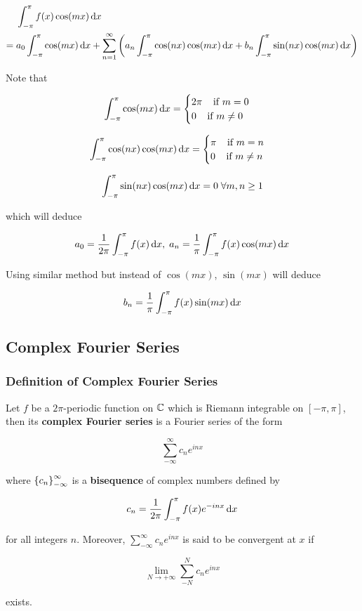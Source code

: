 \documentclass[a4paper,12pt]{article}
\begin{document}
$$\begin{aligned}[t]
  &\int_{-\pi}^{\pi}f(x)\cos(mx)\,\mathrm{d} x\\
  =\;&a_{0}\int_{-\pi}^{\pi}\cos(mx)\,\mathrm{d} x+\sum_{n=1}^{\infty}\left( a_{n}\int_{-\pi}^{\pi}\cos(nx)\cos(mx)\,\mathrm{d} x+b_{n}\int_{-\pi}^{\pi}\sin(nx)\cos(mx)\,\mathrm{d} x\right)
\end{aligned}$$\s

Note that

$$\int_{-\pi}^{\pi}\cos(mx)\,\mathrm{d} x=\begin{cases}
  2\pi\;\;\;\;\text{if }m=0\\
  0\;\;\;\;\text{if }m\neq 0
\end{cases}$$\s

$$\int_{-\pi}^{\pi}\cos(nx)\cos(mx)\,\mathrm{d} x=\begin{cases}
  \pi\;\;\;\;\text{if }m=n\\
  0\;\;\;\;\text{if }m\neq n
\end{cases}$$\s

$$\int_{-\pi}^{\pi}\sin(nx)\cos(mx)\,\mathrm{d} x=0\;\forall m,n\geq 1$$\s

which will deduce

$$a_{0}=\frac{1}{2\pi}\int_{-\pi}^{\pi}f(x)\,\mathrm{d} x,\;a_{n}=\frac{1}{\pi}\int_{-\pi}^{\pi}f(x)\cos(mx)\,\mathrm{d} x$$\s

Using similar method but instead of $\cos(mx)$, $\sin(mx)$ will deduce

$$b_{n}=\frac{1}{\pi}\int_{-\pi}^{\pi}f(x)\sin(mx)\,\mathrm{d} x$$

\subsection{Complex Fourier Series}
\subsubsection{Definition of Complex Fourier Series}
\begin{dft}
  Let $f$ be a $2\pi$-periodic function on $\mathbb{C}$ which is Riemann integrable on $[-\pi,\pi]$, then its \textbf{complex Fourier series} is a Fourier series of the form

  $$\sum_{-\infty}^{\infty}c_{n}e^{inx}$$

  where $\left\{ c_{n}\right\}_{-\infty}^{\infty}$ is a \textbf{bisequence} of complex numbers defined by

  $$c_{n}=\frac{1}{2\pi}\int_{-\pi}^{\pi}f(x)e^{-inx}\,\mathrm{d} x$$\s
  
  for all integers $n$. Moreover, $\sum_{-\infty}^{\infty}c_{n}e^{inx}$ is said to be convergent at $x$ if

  $$\lim_{N\to+\infty}\sum_{-N}^{N}c_{n}e^{inx}$$\s

  exists.
\end{dft}\n
\end{document}
